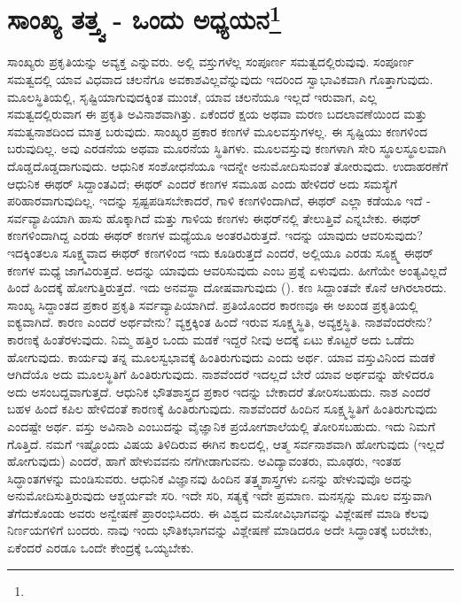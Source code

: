 
\chapter[ಸಾಂಖ್ಯ ತತ್ತ್ವ - ಒಂದು ಅಧ್ಯಯನ]{ಸಾಂಖ್ಯ ತತ್ತ್ವ - ಒಂದು ಅಧ್ಯಯನ\protect\footnote{}}

ಸಾಂಖ್ಯರು ಪ್ರಕೃತಿಯನ್ನು ಅವ್ಯಕ್ತ ಎನ್ನುವರು. ಅಲ್ಲಿ ವಸ್ತುಗಳೆಲ್ಲ ಸಂಪೂರ್ಣ ಸಮತ್ವದಲ್ಲಿರುವುವು. ಸಂಪೂರ್ಣ ಸಮತ್ವದಲ್ಲಿ ಯಾವ ವಿಧವಾದ ಚಲನೆಗೂ ಅವಕಾಶವಿಲ್ಲವೆನ್ನುವುದು ಇದರಿಂದ ಸ್ವಾಭಾವಿಕವಾಗಿ ಗೊತ್ತಾಗುವುದು. ಮೂಲಸ್ಥಿತಿಯಲ್ಲಿ, ಸೃಷ್ಟಿಯಾಗುವುದಕ್ಕಿಂತ ಮುಂಚೆ, ಯಾವ ಚಲನೆಯೂ ಇಲ್ಲದೆ ಇರುವಾಗ, ಎಲ್ಲ ಸಮತ್ವದಲ್ಲಿರುವಾಗ ಈ ಪ್ರಕೃತಿ ಅವಿನಾಶವಾಗಿತ್ತು. ಏಕೆಂದರೆ ಕ್ಷಯ ಅಥವಾ ಮರಣ ಬದಲಾವಣೆಯಿಂದ ಮತ್ತು ಸಮತ್ವನಾಶದಿಂದ ಮಾತ್ರ ಬರುವುದು. ಸಾಂಖ್ಯರ ಪ್ರಕಾರ ಕಣಗಳೆ ಮೂಲವಸ್ತುಗಳಲ್ಲ. ಈ ಸೃಷ್ಟಿಯು ಕಣಗಳಿಂದ ಬರುವುದಿಲ್ಲ. ಅವು ಎರಡನೆಯ ಅಥವಾ ಮೂರನೆಯ ಸ್ಥಿತಿಗಳು. ಮೂಲವಸ್ತುವು ಕಣಗಳಾಗಿ ಸೇರಿ ಸ್ಥೂಲಸ್ಥೂಲವಾಗಿ ದೊಡ್ಡದೊಡ್ಡದಾಗುವುದು. ಆಧುನಿಕ ಸಂಶೋಧನೆಯೂ ಇದನ್ನೇ ಅನುಮೋದಿಸುವಂತೆ ತೋರುವುದು. ಉದಾಹರಣೆಗೆ ಆಧುನಿಕ ಈಥರ್ ಸಿದ್ದಾಂತವಿದೆ; ಈಥರ್ ಎಂದರೆ ಕಣಗಳ ಸಮೂಹ ಎಂದು ಹೇಳಿದರೆ ಅದು ಸಮಸ್ಯೆಗೆ ಪರಿಹಾರವಾಗುವುದಿಲ್ಲ. ಇದನ್ನು ಸ್ಪಷ್ಟಪಡಿಸಬೇಕಾದರೆ, ಗಾಳಿ ಕಣಗಳಿಂದಾಗಿದೆ, ಈಥರ್‌ ಎಲ್ಲಾ ಕಡೆಯೂ ಇದೆ - ಸರ್ವವ್ಯಾಪಿಯಾಗಿ ಹಾಸು ಹೊಕ್ಕಾಗಿದೆ ಮತ್ತು ಗಾಳಿಯ ಕಣಗಳು ಈಥರ್‌ನಲ್ಲಿ ತೇಲುತ್ತಿವೆ ಎನ್ನಬೇಕು. ಈಥರ್ ಕಣಗಳಿಂದಾಗಿದ್ದ ಎರಡು ಈಥರ್ ಕಣಗಳ ಮಧ್ಯೆಯೂ ಅಂತರವಿರುತ್ತದೆ. ಇದನ್ನು ಯಾವುದು ಆವರಿಸುವುದು? ಇದಕ್ಕಿಂತಲೂ ಸೂಕ್ಷ್ಮವಾದ ಈಥರ್ ಕಣಗಳಿಂದ ಇದು ಕೂಡಿರುತ್ತದೆ ಎಂದರೆ, ಅಲ್ಲಿಯೂ ಎರಡು ಸೂಕ್ಷ್ಮ ಈಥರ್ ಕಣಗಳ ಮಧ್ಯೆ ಜಾಗವಿರುತ್ತದೆ. ಅದನ್ನು ಯಾವುದು ಆವರಿಸುವುದು ಎಂಬ ಪ್ರಶ್ನೆ ಏಳುವುದು. ಹೀಗೆಯೇ ಅಂತ್ಯವಿಲ್ಲದೆ ಹಿಂದೆ ಹಿಂದಕ್ಕೆ ಹೋಗುತ್ತಿರುತ್ತದೆ. ಇದು ಅನವಸ್ಥಾ ದೋಷವಾಗುವುದು (). ಕಣ ಸಿದ್ದಾಂತವೇ ಕೊನೆ ಆಗಿರಲಾರದು. ಸಾಂಖ್ಯ ಸಿದ್ದಾಂತದ ಪ್ರಕಾರ ಪ್ರಕೃತಿ ಸರ್ವವ್ಯಾಪಿಯಾಗಿದೆ. ಪ್ರತಿಯೊಂದರ ಕಾರಣವೂ ಈ ಅಖಂಡ ಪ್ರಕೃತಿಯಲ್ಲಿ ಐಕ್ಯವಾಗಿದೆ. ಕಾರಣ ಎಂದರೆ ಅರ್ಥವೇನು? ವ್ಯಕ್ತಕ್ಕಿಂತ ಹಿಂದೆ ಇರುವ ಸೂಕ್ಷ್ಮಸ್ಥಿತಿ, ಅವ್ಯಕ್ತಸ್ಥಿತಿ. ನಾಶವೆಂದರೇನು? ಕಾರಣಕ್ಕೆ ಹಿಂತೆರಳುವುದು. ನಿಮ್ಮ ಹತ್ತಿರ ಒಂದು ಮಡಕೆ ಇದ್ದರೆ ನೀವು ಅದಕ್ಕೆ ಏಟು ಕೊಟ್ಟರೆ ಅದು ಒಡೆದು ಹೋಗುವುದು. ಕಾರ್ಯವು ತನ್ನ ಮೂಲಸ್ವಭಾವಕ್ಕೆ ಹಿಂತಿರುಗುವುದು ಎಂದು ಅರ್ಥ. ಯಾವ ವಸ್ತುವಿನಿಂದ ಮಡಕೆ ಆಗಿದೆಯೊ ಅದು ಮೂಲಸ್ಥಿತಿಗೆ ಹಿಂತಿರುಗುವುದು. ನಾಶವೆಂದರೆ ಇದಲ್ಲದೆ ಬೇರೆ ಯಾವ ಅರ್ಥವನ್ನು ಹೇಳಿದರೂ ಅದು ಅಸಂಬದ್ದವಾಗುತ್ತದೆ. ಆಧುನಿಕ ಭೌತಶಾಸ್ತ್ರದ ಪ್ರಕಾರ ಇದನ್ನು ಬೇಕಾದರೆ ತೋರಿಸಬಹುದು. ನಾಶ ಎಂದರೆ ಬಹಳ ಹಿಂದೆ ಕಪಿಲ ಹೇಳಿದಂತೆ ಕಾರಣಕ್ಕೆ ಹಿಂತಿರುಗುವುದು. ನಾಶವೆಂದರೆ ಹಿಂದಿನ ಸೂಕ್ಷ್ಮಸ್ಥಿತಿಗೆ ಹಿಂತಿರುಗುವುದು ಎಂದಷ್ಟೇ ಅರ್ಥ. ವಸ್ತು ಅವಿನಾಶಿ ಎಂಬುದನ್ನು ವೈಜ್ಞಾನಿಕ ಪ್ರಯೋಗಶಾಲೆಯಲ್ಲಿ ತೋರಿಸಬಹುದು. ಇದು ನಿಮಗೆ ಗೊತ್ತಿದೆ. ನಮಗೆ ಇಷ್ಟೊಂದು ವಿಷಯ ತಿಳಿದಿರುವ ಈಗಿನ ಕಾಲದಲ್ಲಿ, ಆತ್ಮ ಸರ್ವನಾಶವಾಗಿ ಹೋಗುವುದು (ಇಲ್ಲದೆ ಹೋಗುವುದು) ಎಂದರೆ, ಹಾಗೆ ಹೇಳುವವನು ನಗೆಗೀಡಾಗುವನು. ಅವಿದ್ಯಾವಂತರು, ಮೂಢರು, ಇಂತಹ ಸಿದ್ಧಾಂತಗಳನ್ನು ಮಂಡಿಸುವರು. ಆಧುನಿಕ ವಿಜ್ಞಾನವು ಹಿಂದಿನ ತತ್ತ್ವಶಾಸ್ತ್ರಗಳು ಏನನ್ನು ಹೇಳುವುವೊ ಅದನ್ನು ಅನುಮೋದಿಸುತ್ತಿರುವುದು ಆಶ್ಚರ್ಯವೇ ಸರಿ. ಇದೇ ಸರಿ, ಸತ್ಯಕ್ಕೆ ಇದೇ ಪ್ರಮಾಣ. ಮನಸ್ಸನ್ನು ಮೂಲ ವಸ್ತುವಾಗಿ ತೆಗೆದುಕೊಂಡು ಅವರು ಅನ್ವೇಷಣೆ ಪ್ರಾರಂಭಿಸಿದರು. ಈ ವಿಶ್ವದ ಮನೋವಿಭಾಗವನ್ನು ವಿಶ್ಲೇಷಣೆ ಮಾಡಿ ಕೆಲವು ನಿರ್ಣಯಗಳಿಗೆ ಬಂದರು. ನಾವು ಇಂದು ಭೌತಿಕಭಾಗವನ್ನು ವಿಶ್ಲೇಷಣೆ ಮಾಡಿದರೂ ಅದೇ ಸಿದ್ಧಾಂತಕ್ಕೆ ಬರಬೇಕು, ಏಕೆಂದರೆ ಎರಡೂ ಒಂದೇ ಕೇಂದ್ರಕ್ಕೆ ಒಯ್ಯಬೇಕು.

